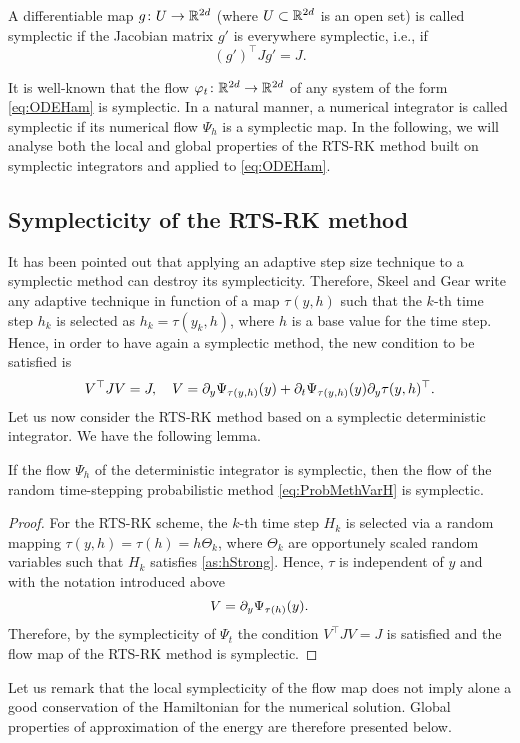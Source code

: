 \documentclass[10pt]{article}
\begin{document}
\begin{definition} A differentiable map $g\colon U \to \R^{2d}$ (where $U\subset \R^{2d}$ is an open set) is called symplectic if the Jacobian matrix $g'$ is everywhere symplectic, i.e., if
	\begin{equation}\label{eq:SymplecticMap}
	(g')^\top J g' = J.
	\end{equation}	
\end{definition}
It is well-known that the flow $\phi_t\colon\R^{2d}\to\R^{2d}$ of any system of the form \eqref{eq:ODEHam} is symplectic. In a natural manner, a numerical integrator is called symplectic if its numerical flow $\Psi_h$ is a symplectic map. In the following, we will analyse both the local and global properties of the RTS-RK method built on symplectic integrators and applied to \eqref{eq:ODEHam}.

\subsection{Symplecticity of the RTS-RK method} It has been pointed out \cite{SkG92, HLW06} that applying an adaptive step size technique to a symplectic method can destroy its symplecticity. Therefore, Skeel and Gear \cite{SkG92} write any adaptive technique in function of a map $\tau(y, h)$ such that the $k$-th time step $h_k$ is selected as $h_k = \tau(y_k, h)$, where $h$ is a base value for the time step. Hence, in order to have again a symplectic method, the new condition to be satisfied is
\begin{equation}\label{eq:SymplecticCondition}
V^\top J V = J, \quad V = \pdv{\Psi_{\tau(y, h)}(y)}{y} + \pdv{\Psi_{\tau(y, h)}(y)}{t}\pdv{\tau(y, h)}{y}^\top.
\end{equation}
Let us now consider the RTS-RK method based on a symplectic deterministic integrator. We have the following lemma. 
\begin{lemma}\label{lem:SympRTSRK} If the flow $\Psi_h$ of the deterministic integrator is symplectic, then the flow of the random time-stepping probabilistic method \eqref{eq:ProbMethVarH} is symplectic.
\end{lemma}
\begin{proof} For the RTS-RK scheme, the $k$-th time step $H_k$ is selected via a random mapping $\tau(y, h) = \tau(h) = h\Theta_k$, where $\Theta_k$ are opportunely scaled random variables such that $H_k$ satisfies \cref{as:hStrong}. Hence, $\tau$ is independent of $y$ and with the notation introduced above 
	\begin{equation}
	V = \pdv{\Psi_{\tau(h)}(y)}{y}.
	\end{equation}
	Therefore, by the symplecticity of $\Psi_t$ the condition $V^\top J V = J$ is satisfied and the flow map of the RTS-RK method is symplectic.
\end{proof}
Let us remark that the local symplecticity of the flow map does not imply alone a good conservation of the Hamiltonian for the numerical solution. Global properties of approximation of the energy are therefore presented below.
\end{document}
